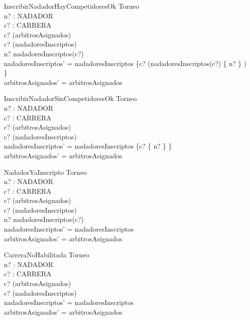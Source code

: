 \documentclass{article}
\begin{document}
\begin{schema}{InscribirNadadorHayCompetidoresOk}
\Delta Torneo \\
n? : NADADOR \\
c? : CARRERA \\
\where
c? \in \dom(arbitrosAsignados) \\
c? \in \dom(nadadoresInscriptos) \\
n? \notin nadadoresInscriptos(c?) \\
nadadoresInscriptos' = nadadoresInscriptos \oplus \{c? \mapsto (nadadoresInscriptos(c?) \cup \{ n? \} ) \} \\
arbitrosAsignados' = arbitrosAsignados
\end{schema}

\begin{schema}{InscribirNadadorSinCompetidoresOk}
\Delta Torneo \\
n? : NADADOR \\
c? : CARRERA \\
\where
c? \in \dom(arbitrosAsignados) \\
c? \notin \dom(nadadoresInscriptos) \\
nadadoresInscriptos' = nadadoresInscriptos \cup \{c? \mapsto  \{ n? \} \} \\
arbitrosAsignados' = arbitrosAsignados
\end{schema}

\begin{schema}{NadadorYaInscripto}
\Xi Torneo \\
n? : NADADOR \\
c? : CARRERA \\
\where
c? \in \dom(arbitrosAsignados) \\
c? \in \dom(nadadoresInscriptos) \\
n? \in nadadoresInscriptos(c?) \\
nadadoresInscriptos' = nadadoresInscriptos \\
arbitrosAsignados' = arbitrosAsignados
\end{schema}

\begin{schema}{CarreraNoHabilitada}
\Xi Torneo \\
n? : NADADOR \\
c? : CARRERA \\
\where
c? \notin \dom(arbitrosAsignados) \\
c? \notin \dom(nadadoresInscriptos) \\
nadadoresInscriptos' = nadadoresInscriptos \\
arbitrosAsignados' = arbitrosAsignados
\end{schema}
\end{document}
